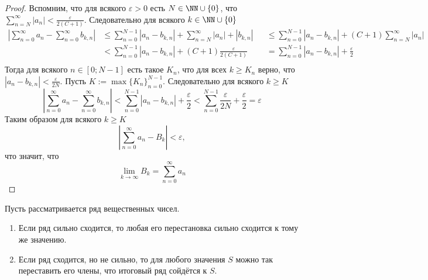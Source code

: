 \documentclass[12pt,a4paper]{article}
\begin{document}
    \begin{proof}
        Вспомним, что для всякого $\varepsilon > 0$ есть $N \in \NN \cup \{0\}$, что $\sum_{n=N}^\infty |a_n| < \frac{\varepsilon}{2(C+1)}$. Следовательно для всякого $k \in \NN \cup \{0\}$
        \begin{align*}
            \left|\sum_{n=0}^\infty a_n - \sum_{n=0}^\infty b_{k, n}\right|
            &\leqslant \sum_{n=0}^{N-1} |a_n - b_{k,n}| + \sum_{n=N}^\infty |a_n| + |b_{k, n}|&
            &\leqslant \sum_{n=0}^{N-1} |a_n - b_{k,n}| + (C+1) \sum_{n=N}^\infty |a_n|\\
            &< \sum_{n=0}^{N-1} |a_n - b_{k,n}| + (C+1) \frac{\varepsilon}{2(C+1)}&
            &= \sum_{n=0}^{N-1} |a_n - b_{k,n}| + \frac{\varepsilon}{2}\\
        \end{align*}
        Тогда для всякого $n \in [0; N-1]$ есть такое $K_n$, что для всех $k \geqslant K_n$ верно, что $|a_n - b_{k, n}| < \frac{\varepsilon}{2N}$. Пусть $K := \max\{K_n\}_{n=0}^{N-1}$. Следовательно для всякого $k \geqslant K$
        \[
            \left|\sum_{n=0}^\infty a_n - \sum_{n=0}^\infty b_{k, n}\right|
            < \sum_{n=0}^{N-1} |a_n - b_{k,n}| + \frac{\varepsilon}{2}
            < \sum_{n=0}^{N-1} \frac{\varepsilon}{2N} + \frac{\varepsilon}{2}
            = \varepsilon
        \]
        Таким образом для всякого $k \geqslant K$
        \[\left|\sum_{n=0}^\infty a_n - B_k\right| < \varepsilon,\]
        что значит, что
        \[\lim_{k \to \infty} B_k = \sum_{n=0}^\infty a_n\]
    \end{proof}

    \begin{theorem}
        Пусть рассматривается ряд вещественных чисел.
        \begin{enumerate}
            \item Если ряд сильно сходится, то любая его перестановка сильно сходится к тому же значению.
            \item Если ряд сходится, но не сильно, то для любого значения $S$ можно так переставить его члены, что итоговый ряд сойдётся к $S$.
        \end{enumerate}
    \end{theorem}
\end{document}
